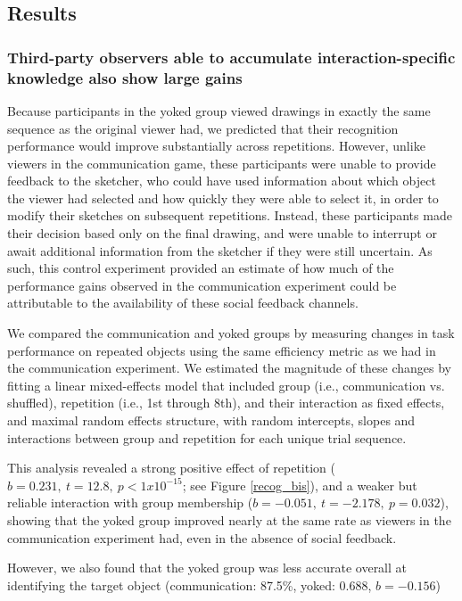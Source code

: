 \documentclass[10pt,letterpaper]{article}
\begin{document}
\subsection{Results}

\subsubsection{Third-party observers able to accumulate interaction-specific knowledge also show large gains}

Because participants in the yoked group viewed drawings in exactly the same sequence as the original viewer had, we predicted that their recognition performance would improve substantially across repetitions. 
However, unlike viewers in the communication game, these participants were unable to provide feedback to the sketcher, who could have used information about which object the viewer had selected and how quickly they were able to select it, in order to modify their sketches on subsequent repetitions. 
Instead, these participants made their decision based only on the final drawing, and were unable to interrupt or await additional information from the sketcher if they were still uncertain.
As such, this control experiment provided an estimate of how much of the performance gains observed in the communication experiment could be attributable to the availability of these social feedback channels.

We compared the communication and yoked groups by measuring changes in task performance on repeated objects using the same efficiency metric as we had in the communication experiment.
We estimated the magnitude of these changes by fitting a linear mixed-effects model that included group (i.e., communication vs. shuffled), repetition (i.e., 1st through 8th), and their interaction as fixed effects, and maximal random effects structure, with random intercepts, slopes and interactions between group and repetition for each unique trial sequence. 

This analysis revealed a strong positive effect of repetition ($b = 0.231, ~t = 12.8,~p < 1x10^{-15}$; see Figure \ref{recog_bis}), and a weaker but reliable interaction with group membership ($b = -0.051, ~t = -2.178, ~p = 0.032$), showing that the yoked group improved nearly at the same rate as viewers in the communication experiment had, even in the absence of social feedback. 

However, we also found that the yoked group was less accurate overall at identifying the target object (communication: 87.5\%, yoked: 0.688, $b = -0.156$)
\end{document}
